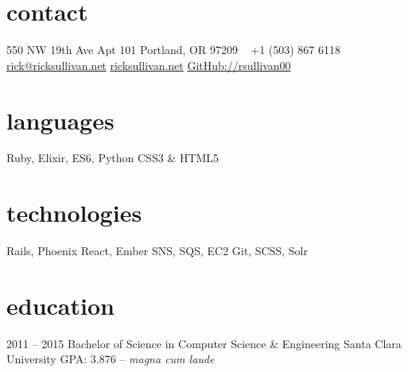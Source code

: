 \documentclass[]{friggeri-cv} %
\begin{document}


\begin{aside} %
\section{contact}
550 NW 19th Ave Apt 101
Portland, OR 97209
~
+1 (503) 867 6118
~
\href{mailto:rick@ricksullivan.net}{rick@ricksullivan.net}
\href{https://ricksullivan.net}{ricksullivan.net}
\href{https://github.com/rsullivan00}{GitHub://rsullivan00}
%
\section{languages}
Ruby, Elixir, ES6, Python
CSS3 \& HTML5
%
\section{technologies}
Rails, Phoenix
React, Ember
SNS, SQS, EC2
Git, SCSS, Solr
\end{aside}

\section{education}

\begin{entrylist}

\entry
{2011 -- 2015}
{Bachelor of Science {\normalfont in Computer Science \& Engineering}}
{Santa Clara University}
{GPA: 3.876 -- \emph{magna cum laude}}



\end{entrylist}

\end{document}
